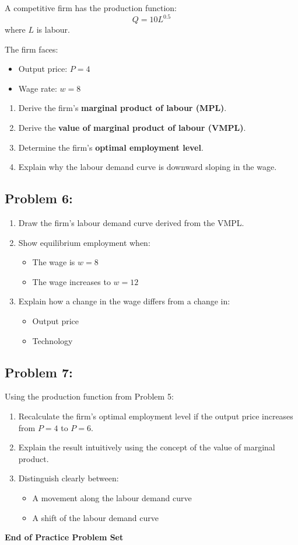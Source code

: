 \documentclass[12pt]{article}
\begin{document}
A competitive firm has the production function:
\[
Q = 10L^{0.5}
\]
where \( L \) is labour.

The firm faces:
\begin{itemize}
\item Output price: \( P = 4 \)
\item Wage rate: \( w = 8 \)
\end{itemize}

\begin{enumerate}
\item Derive the firm’s \textbf{marginal product of labour (MPL)}.
\item Derive the \textbf{value of marginal product of labour (VMPL)}.
\item Determine the firm’s \textbf{optimal employment level}.
\item Explain why the labour demand curve is downward sloping in the wage.
\end{enumerate}

\subsection*{Problem 6:}

\begin{enumerate}
\item Draw the firm’s labour demand curve derived from the VMPL.
\item Show equilibrium employment when:
\begin{itemize}
\item The wage is \( w = 8 \)
\item The wage increases to \( w = 12 \)
\end{itemize}
\item Explain how a change in the wage differs from a change in:
\begin{itemize}
\item Output price
\item Technology
\end{itemize}
\end{enumerate}

\subsection*{Problem 7: }

Using the production function from Problem 5:

\begin{enumerate}
\item Recalculate the firm’s optimal employment level if the output price increases from \( P = 4 \) to \( P = 6 \).
\item Explain the result intuitively using the concept of the value of marginal product.
\item Distinguish clearly between:
\begin{itemize}
\item A movement along the labour demand curve
\item A shift of the labour demand curve
\end{itemize}
\end{enumerate}

\vfill
\textbf{End of Practice Problem Set}
\end{document}
